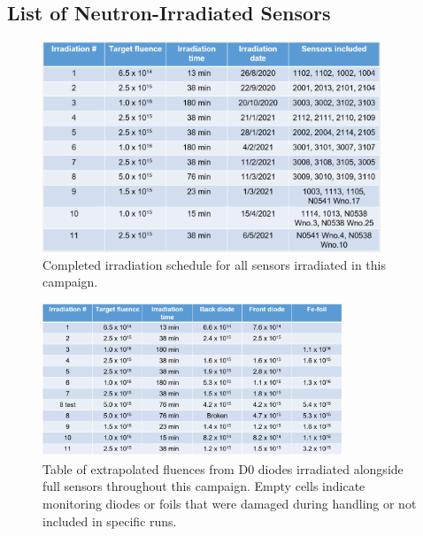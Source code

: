 \subsection{List of Neutron-Irradiated Sensors}
\label{subsec:sensors_irradiation}

\begin{figure}[!hbt]
  \begin{center}
    \includegraphics[width=0.90\textwidth]{figures/Completed_Irradiation_Schedule_at_RINSC}
    \caption{Completed irradiation schedule for all sensors irradiated in this campaign.}
    \label{fig:Irradiation_Schedule}
  \end{center}
\end{figure}

\begin{figure}[!hbt]
  \begin{center}
    \includegraphics[width=0.80\textwidth]{figures/Round_1_Achieved_Fluences}
    \caption{Table of extrapolated fluences from D0 diodes irradiated alongside full sensors throughout this campaign. Empty cells indicate monitoring diodes or foils that were damaged during handling or not included in specific runs.}
    \label{fig:Round_1_Achieved_Fluences}
  \end{center}
\end{figure}